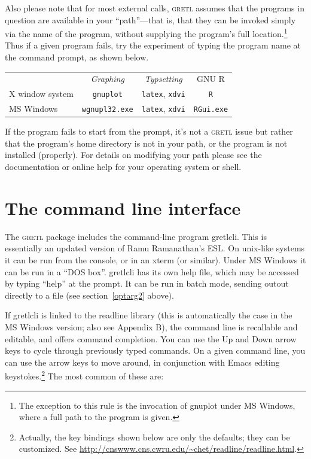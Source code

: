 \documentclass{article}
\begin{document}
Also please note that for most external calls, \textsc{gretl} assumes
that the programs in question are available in your ``path''---that
is, that they can be invoked simply via the name of the program,
without supplying the program's full location.\footnote{The exception
  to this rule is the invocation of gnuplot under MS Windows, where a
  full path to the program is given.}  Thus if a given program fails,
try the experiment of typing the program name at the command prompt,
as shown below.

\vspace{8pt}
\begin{center}
\begin{tabular}{lccc}
                 & \textit{Graphing} & \textit{Typsetting} & GNU R \\[4pt]
X window system  & \texttt{gnuplot} & \texttt{latex}, \texttt{xdvi} & 
   \texttt{R}\\
MS Windows & \texttt{wgnupl32.exe} & \texttt{latex}, \texttt{xdvi} &
   \texttt{RGui.exe}\\
\end{tabular}
\end{center}
\vspace{8pt}

If the program fails to start from the prompt, it's not a
\textsc{gretl} issue but rather that the program's home directory is
not in your path, or the program is not installed (properly).  For
details on modifying your path please see the documentation or online
help for your operating system or shell.


\section{The command line interface}
\label{cli}

The \textsc{gretl} package includes the command-line program
\textsf{gretlcli}.  This is essentially an updated version of Ramu
Ramanathan's ESL.  On unix-like systems it can be run from the
console, or in an xterm (or similar).  Under MS Windows it can be run
in a ``DOS box''.  \textsf{gretlcli} has its own help file, which may
be accessed by typing ``help'' at the prompt. It can be run in batch
mode, sending outout directly to a file (see section~\ref{optarg2}
above).

If \textsf{gretlcli} is linked to the \textsf{readline} library (this
is automatically the case in the MS Windows version; also see Appendix
B), the command line is recallable and editable, and offers command
completion.  You can use the Up and Down arrow keys to cycle through
previously typed commands.  On a given command line, you can use the
arrow keys to move around, in conjunction with Emacs editing
keystokes.\footnote{Actually, the key bindings shown below are only
  the defaults; they can be customized.  See
  \url{http://cnswww.cns.cwru.edu/~chet/readline/readline.html}.} The
most common of these are:
\end{document}
